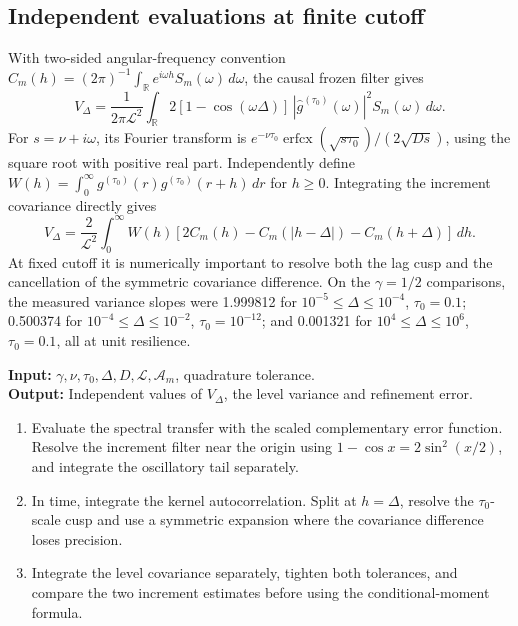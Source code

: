 \documentclass[11pt]{article}
\newcommand{\Liq}{\mathcal L}
\begin{document}
\subsection{Independent evaluations at finite cutoff}
With two-sided angular-frequency convention
\(C_m(h)=(2\pi)^{-1}\int_{\mathbb R}e^{i\omega h}S_m(\omega)\,d\omega\),
the causal frozen filter gives
\[
 V_\Delta=\frac{1}{2\pi\Liq^2}\int_{\mathbb R}
 2[1-\cos(\omega\Delta)]\,|\widehat g^{(\tau_0)}(\omega)|^2
 S_m(\omega)\,d\omega .
\]
For \(s=\nu+i\omega\), its Fourier transform is
\(e^{-\nu\tau_0}\operatorname{erfcx}(\sqrt{s\tau_0})/(2\sqrt{Ds})\),
using the square root with positive real part. Independently define
\(W(h)=\int_0^\infty g^{(\tau_0)}(r)g^{(\tau_0)}(r+h)\,dr\) for \(h\ge0\).
Integrating the increment covariance directly gives
\[
 V_\Delta=\frac{2}{\Liq^2}\int_0^\infty W(h)
 [2C_m(h)-C_m(|h-\Delta|)-C_m(h+\Delta)]\,dh .
\]
At fixed cutoff it is numerically important to resolve both the lag cusp
and the cancellation of the symmetric covariance difference. On the
\(\gamma=1/2\) comparisons, the measured variance slopes were 1.999812
for \(10^{-5}\le\Delta\le10^{-4}\), \(\tau_0=0.1\); 0.500374 for
\(10^{-4}\le\Delta\le10^{-2}\), \(\tau_0=10^{-12}\); and 0.001321 for
\(10^4\le\Delta\le10^6\), \(\tau_0=0.1\), all at unit resilience.
\begin{algorithm}[htbp]
\caption{Stationary frozen increment variance at finite resolution}
\small\textbf{Input:} \(\gamma,\nu,\tau_0,\Delta,D,\Liq,\mathcal A_m\), quadrature tolerance.\\
\textbf{Output:} Independent values of \(V_\Delta\), the level variance and refinement error.
\begin{enumerate}\setlength{\itemsep}{0.1em}
\item Evaluate the spectral transfer with the scaled complementary error function. Resolve the increment filter near the origin using \(1-\cos x=2\sin^2(x/2)\), and integrate the oscillatory tail separately.
\item In time, integrate the kernel autocorrelation. Split at \(h=\Delta\), resolve the \(\tau_0\)-scale cusp and use a symmetric expansion where the covariance difference loses precision.
\item Integrate the level covariance separately, tighten both tolerances, and compare the two increment estimates before using the conditional-moment formula.
\end{enumerate}
\end{algorithm}
\FloatBarrier
\end{document}

